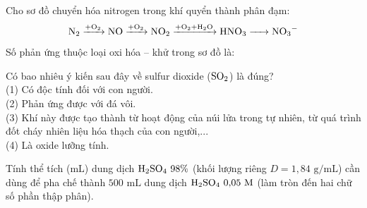 \documentclass[12pt,a4paper]{article}
\begin{document}
\begin{ex}
Cho sơ đồ chuyển hóa nitrogen trong khí quyển thành phân đạm:
\[\ce{N2 ->[+O2] NO ->[+O2] NO2 ->[+O2 + H2O] HNO3 -> NO3-}\]
Số phản ứng thuộc loại oxi hóa -- khử trong sơ đồ là:

\end{ex}

\begin{ex}
Có bao nhiêu ý kiến sau đây về sulfur dioxide ($\ce{SO2}$) là đúng?\\
(1) Có độc tính đối với con người.\\
(2) Phản ứng được với đá vôi.\\
(3) Khí này được tạo thành từ hoạt động của núi lửa trong tự nhiên, từ quá trình đốt cháy nhiên liệu hóa thạch của con người,...\\
(4) Là oxide lưỡng tính.

\end{ex}

\begin{ex}
Tính thể tích ($\text{mL}$) dung dịch $\ce{H2SO4}\ 98\%$ (khối lượng riêng $D = 1{,}84\text{ g/mL}$) cần dùng để pha chế thành $500\text{ mL}$ dung dịch $\ce{H2SO4}\ 0{,}05\text{ M}$ (làm tròn đến hai chữ số phần thập phân).

\end{ex}
\end{document}
